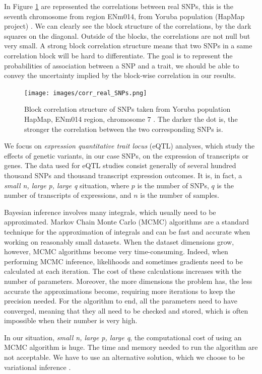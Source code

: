 \documentclass[a4paper, 11pt]{report}
\numberwithin{equation}{chapter}
\begin{document}
In Figure \ref{fig:corr} are represented the correlations between real SNPs, this is the seventh chromosome from region ENm014, from Yoruba population (HapMap project) \cite{hapmap}. We can clearly see the block structure of the correlations, by the dark squares on the diagonal. Outside of the blocks, the correlations are not null but very small. A strong block correlation structure means that two SNPs in a same correlation block will be hard to differentiate. The goal is to represent the probabilities of association between a SNP and a trait, we should be able to convey the uncertainty implied by the block-wise correlation in our results.

\begin{figure}[h!]
\texttt{[image: images/corr\_real\_SNPs.png]}
\caption{\label{fig:corr} Block correlation structure of SNPs taken from Yoruba population HapMap, ENm014 region, chromosome $7$ \cite{hapmap}. The darker the dot is, the stronger the correlation between the two corresponding SNPs is.}
\end{figure}

We focus on \textit{expression quantitative trait locus} (eQTL) analyses, which study the effects of genetic variants, in our case SNPs, on the expression of transcripts or genes. The data used for eQTL studies consist generally of several hundred thousand SNPs and thousand transcript expression outcomes. It is, in fact, a \textit{small n, large p, large q} situation, where $p$ is the number of SNPs, $q$ is the number of transcripts of expressions, and $n$ is the number of samples.

Bayesian inference involves many integrals, which usually need to be approximated. Markov Chain Monte Carlo (MCMC) algorithms are a standard technique for the approximation of integrals and can be fast and accurate when working on reasonably small datasets. When the dataset dimensions grow, however, MCMC algorithms become very time-consuming. Indeed, when performing MCMC inference, likelihoods and sometimes gradients need to be calculated at each iteration. The cost of these calculations increases with the number of parameters. Moreover, the more dimensions the problem has, the less accurate the approximations become, requiring more iterations to keep the precision needed. For the algorithm to end, all the parameters need to have converged, meaning that they all need to be checked and stored, which is often impossible when their number is very high.

In our situation, \textit{small n, large p, large q}, the computational cost of using an MCMC algorithm is huge. The time and memory needed to run the algorithm are not acceptable. We have to use an alternative solution, which we choose to be variational inference \cite{varInf}. 
\end{document}

